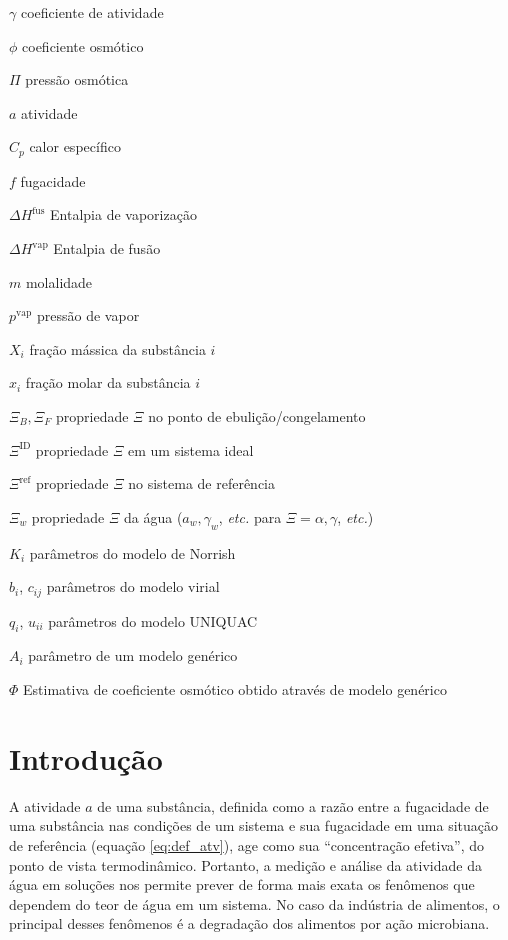 \documentclass[
	12pt,				%
	openright,
	twoside,
	a4paper,			%
	english,			%
	french,				%
	spanish,			%
	brazil				%
	]{abntex2}
\begin{document}
\begin{simbolos}
	\item[$ \gamma $] coeficiente de atividade
	\item[$ \phi $] coeficiente osmótico
	\item[$ \Pi $] pressão osmótica
	\item[$ a $] atividade
	\item[$ C_p $] calor específico
	\item[$ f $] fugacidade
	\item[$ \Delta H^\text{fus} $] Entalpia de vaporização
	\item[$ \Delta H^\text{vap} $] Entalpia de fusão
	\item[$ m $] molalidade
	\item[$ p^\text{vap} $] pressão de vapor
	\item[$ X_i $] fração mássica da substância $i$
	\item[$ x_i $] fração molar da substância $i$
	\item[$ \Xi_B, \Xi_F $] propriedade $\Xi$ no ponto de ebulição/congelamento
	\item[$ \Xi^\text{ID} $] propriedade $\Xi$ em um sistema ideal
	\item[$ \Xi^\text{ref} $] propriedade $\Xi$ no sistema de referência
	\item[$ \Xi_w $] propriedade $\Xi$ da água ($a_w, \gamma_w$, \textit{etc.} %
		para $\Xi = \alpha, \gamma$, \textit{etc.})
	\item[$K_i$] parâmetros do modelo de Norrish
	\item[$b_i$, $c_{ij}$] parâmetros do modelo virial
	\item[$q_i$, $u_{ii}$] parâmetros do modelo UNIQUAC
	\item[$A_i$] parâmetro de um modelo genérico
	\item[$\Phi$] Estimativa de coeficiente osmótico obtido através de %
		modelo genérico
\end{simbolos}

\tableofcontents*
\cleardoublepage

\textual

\part{Introdução}

A atividade $a$ de uma substância, definida \cite{sandler2017} como
a razão entre a fugacidade de uma substância nas condições de um sistema
e sua fugacidade em uma situação de referência (equação \ref{eq:def_atv}),
age como sua ``concentração efetiva'', do ponto de vista termodinâmico.
Portanto, a medição e análise da atividade da água em soluções nos permite
prever de forma mais exata os fenômenos que dependem do teor de água em
um sistema. No caso da indústria de alimentos, o principal desses fenômenos
é a degradação dos alimentos por ação microbiana.
\end{document}
